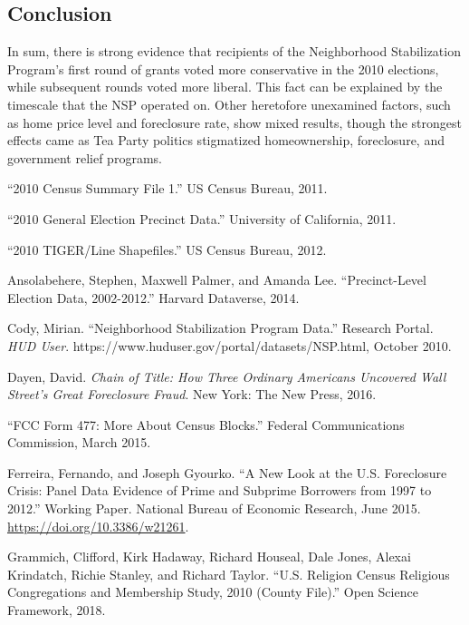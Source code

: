 \documentclass[
]{article}
\begin{document}
\hypertarget{conclusion}{%
\subsection{Conclusion}\label{conclusion}}

In sum, there is strong evidence that recipients of the Neighborhood Stabilization Program's first round of grants voted more conservative in the 2010 elections, while subsequent rounds voted more liberal.
This fact can be explained by the timescale that the NSP operated on.
Other heretofore unexamined factors, such as home price level and foreclosure rate, show mixed results, though the strongest effects came as Tea Party politics stigmatized homeownership, foreclosure, and government relief programs.

\hypertarget{refs}{}
\leavevmode\hypertarget{ref-20112010b}{}%
``2010 Census Summary File 1.'' US Census Bureau, 2011.

\leavevmode\hypertarget{ref-20112010}{}%
``2010 General Election Precinct Data.'' University of California, 2011.

\leavevmode\hypertarget{ref-20122010}{}%
``2010 TIGER/Line Shapefiles.'' US Census Bureau, 2012.

\leavevmode\hypertarget{ref-ansolabehere2014precinctlevel}{}%
Ansolabehere, Stephen, Maxwell Palmer, and Amanda Lee. ``Precinct-Level Election Data, 2002-2012.'' Harvard Dataverse, 2014.

\leavevmode\hypertarget{ref-cody2010neighborhood}{}%
Cody, Mirian. ``Neighborhood Stabilization Program Data.'' Research Portal. \emph{HUD User}. https://www.huduser.gov/portal/datasets/NSP.html, October 2010.

\leavevmode\hypertarget{ref-dayenChainTitleHow2016}{}%
Dayen, David. \emph{Chain of Title: How Three Ordinary Americans Uncovered Wall Street's Great Foreclosure Fraud}. New York: The New Press, 2016.

\leavevmode\hypertarget{ref-2015fcc}{}%
``FCC Form 477: More About Census Blocks.'' Federal Communications Commission, March 2015.

\leavevmode\hypertarget{ref-ferreira2015new}{}%
Ferreira, Fernando, and Joseph Gyourko. ``A New Look at the U.S. Foreclosure Crisis: Panel Data Evidence of Prime and Subprime Borrowers from 1997 to 2012.'' Working Paper. National Bureau of Economic Research, June 2015. \url{https://doi.org/10.3386/w21261}.

\leavevmode\hypertarget{ref-grammich2018religion}{}%
Grammich, Clifford, Kirk Hadaway, Richard Houseal, Dale Jones, Alexai Krindatch, Richie Stanley, and Richard Taylor. ``U.S. Religion Census Religious Congregations and Membership Study, 2010 (County File).'' Open Science Framework, 2018.
\end{document}
